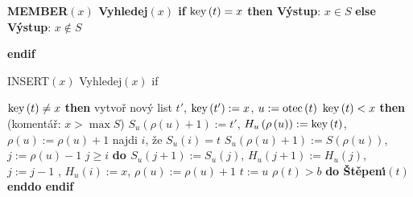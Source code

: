 {\bf MEMBER$\left(x\right)$\newline 
Vyhledej$\left(x\right)$\newline 
if} $\operatorname{key}\left(t\right)=x$ {\bf then V\'ystup}: $x\in S$ {\bf else V\'ystup}: $x\notin S$ {\bf endif
\medskip

INSERT$\left(x\right)$\newline
Vyhledej$\left(x\right)$\newline 
if} $\operatorname{key}\left(t\right)\ne x$ {\bf then}\newline 
\phantom{---}vytvo\v r nov\'y list $t'$, $\operatorname{key}\left(t'\right):=x$, $u:=\operatorname{otec}\left(t\right)$\newline 
\phantom{---}{\bf if} $\operatorname{key}\left(t\right)<x$ {\bf then}\newline 
(koment\'a\v r: $x>\max S$)\newline 
\phantom{------}$S_u\left(\rho \left(u\right)+1\right):=t'$, $H_u\left(\rho \left(u\right)\right):=\operatorname{key}\left(t\right)$, $\rho \left(u\right):=\rho 
\left(u\right)+1$\newline 
\phantom{---}{\bf else}\newline 
\phantom{------}najdi $i$, \v ze $S_u\left(i\right)=t$\newline 
\phantom{------}$S_u\left(\rho \left(u\right)+1\right):=S\left(\rho \left(u\right)\right)$, $j:=\rho \left(u\right)-1$\newline 
\phantom{------}{\bf while} $j\ge i$ {\bf do\newline 
\phantom{---------}$S_u\left(j+1\right):=S_u\left(j\right)$}, $H_u\left(j+1\right):=H_u\left(j\right)$, $j:=j-1$\newline 
{}, $H_u\left(i\right):=x$, $\rho \left(u\right):=\rho \left(u\right)+1$\newline 
\phantom{---}{\bf endif}\newline 
\phantom{---}$t:=u$\newline 
\phantom{---}{\bf while} $\rho \left(t\right)>b$ {\bf do \v St\v epen\'\i$\left(t\right)$ enddo\newline 
endif}
\medskip

